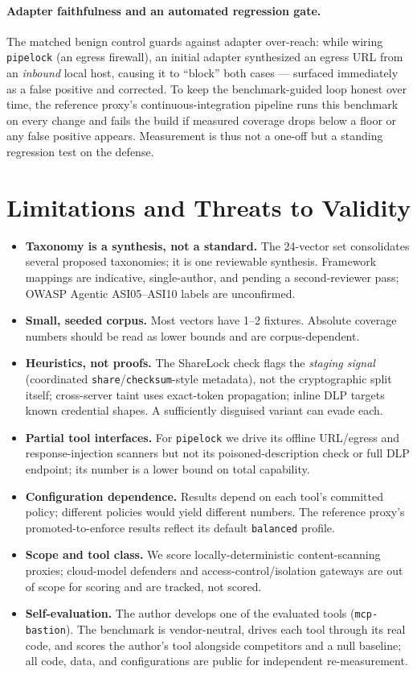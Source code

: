 \documentclass[11pt]{article}
\newcommand{\code}[1]{\texttt{\small #1}}
\begin{document}
\paragraph{Adapter faithfulness and an automated regression gate.} The matched benign control guards against adapter over-reach: while wiring \code{pipelock} (an egress firewall), an initial adapter synthesized an egress URL from an \emph{inbound} local host, causing it to ``block'' both cases --- surfaced immediately as a false positive and corrected. To keep the benchmark-guided loop honest over time, the reference proxy's continuous-integration pipeline runs this benchmark on every change and fails the build if measured coverage drops below a floor or any false positive appears. Measurement is thus not a one-off but a standing regression test on the defense.

\section{Limitations and Threats to Validity}
\label{sec:limits}
\begin{itemize}[leftmargin=1.4em,itemsep=1pt,topsep=2pt]
  \item \textbf{Taxonomy is a synthesis, not a standard.} The 24-vector set consolidates several proposed taxonomies; it is one reviewable synthesis. Framework mappings are indicative, single-author, and pending a second-reviewer pass; OWASP Agentic ASI05--ASI10 labels are unconfirmed.
  \item \textbf{Small, seeded corpus.} Most vectors have 1--2 fixtures. Absolute coverage numbers should be read as lower bounds and are corpus-dependent.
  \item \textbf{Heuristics, not proofs.} The ShareLock check flags the \emph{staging signal} (coordinated \code{share}/\code{checksum}-style metadata), not the cryptographic split itself; cross-server taint uses exact-token propagation; inline DLP targets known credential shapes. A sufficiently disguised variant can evade each.
  \item \textbf{Partial tool interfaces.} For \code{pipelock} we drive its offline URL/egress and response-injection scanners but not its poisoned-description check or full DLP endpoint; its number is a lower bound on total capability.
  \item \textbf{Configuration dependence.} Results depend on each tool's committed policy; different policies would yield different numbers. The reference proxy's promoted-to-enforce results reflect its default \code{balanced} profile.
  \item \textbf{Scope and tool class.} We score locally-deterministic content-scanning proxies; cloud-model defenders and access-control/isolation gateways are out of scope for scoring and are tracked, not scored.
  \item \textbf{Self-evaluation.} The author develops one of the evaluated tools (\code{mcp-bastion}). The benchmark is vendor-neutral, drives each tool through its real code, and scores the author's tool alongside competitors and a null baseline; all code, data, and configurations are public for independent re-measurement.
\end{itemize}
\end{document}
